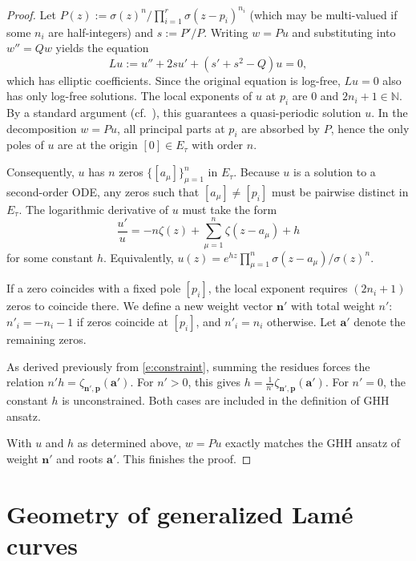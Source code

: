 \documentclass[11pt]{amsart}
\theoremstyle{remark}
\numberwithin{equation}{section}
\begin{document}
\begin{proof}
Let $P(z) := \sigma(z)^n / \prod_{i=1}^r \sigma(z-p_i)^{n_i}$ (which may be multi-valued if some $n_i$ are half-integers) and $s := P'/P$. Writing $w = Pu$ and substituting into $w'' = Qw$ yields the equation
\[
Lu := u'' + 2s u' + (s' + s^2 - Q)u = 0,
\]
which has elliptic coefficients. Since the original equation is log-free, $Lu = 0$ also has only log-free solutions. 
The local exponents of $u$ at $p_i$ are $0$ and $2n_i+1 \in \mathbb{N}$. By a standard argument (cf.~\cite[p.376]{Ince_1956}), this guarantees a quasi-periodic solution $u$. In the decomposition $w = Pu$, all principal parts at $p_i$ are absorbed by $P$, hence the only poles of $u$ are at the origin $[0] \in E_\tau$ with order $n$. 

Consequently, $u$ has $n$ zeros $\{[a_\mu]\}_{\mu=1}^n$ in $E_\tau$. Because $u$ is a solution to a second-order ODE, any zeros such that $[a_\mu] \neq [p_i]$ must be pairwise distinct in $E_\tau$. The logarithmic derivative of $u$ must take the form
\[
\frac{u'}{u} = -n \zeta(z) + \sum_{\mu = 1}^n \zeta(z - a_\mu) + h
\]
for some constant $h$. Equivalently, $u(z) = e^{hz} \prod_{\mu = 1}^n \sigma (z - a_\mu)/\sigma(z)^n$.

If a zero coincides with a fixed pole $[p_i]$, the local exponent requires $(2n_i+1)$ zeros to coincide there. We define a new weight vector $\mathbf{n}'$ with total weight $n'$: $n'_i = -n_i-1$ if zeros coincide at $[p_i]$, and $n'_i = n_i$ otherwise. Let $\mathbf{a}'$ denote the remaining zeros.

As derived previously from \eqref{e:constraint}, summing the residues forces the relation $n'h = \zeta_{\mathbf{n}',\mathbf{p}}(\mathbf{a}')$. For $n'>0$, this gives $h = \frac{1}{n'}\zeta_{\mathbf{n}',\mathbf{p}}(\mathbf{a}')$. For $n'=0$, the constant $h$ is unconstrained. Both cases are included in the definition of GHH ansatz.

With $u$ and $h$ as determined above, $w=Pu$ exactly matches the GHH ansatz of weight $\mathbf{n}'$ and roots $\mathbf{a}'$. This finishes the proof.
\end{proof}


\section{Geometry of generalized Lam\'e curves}
\end{document}
